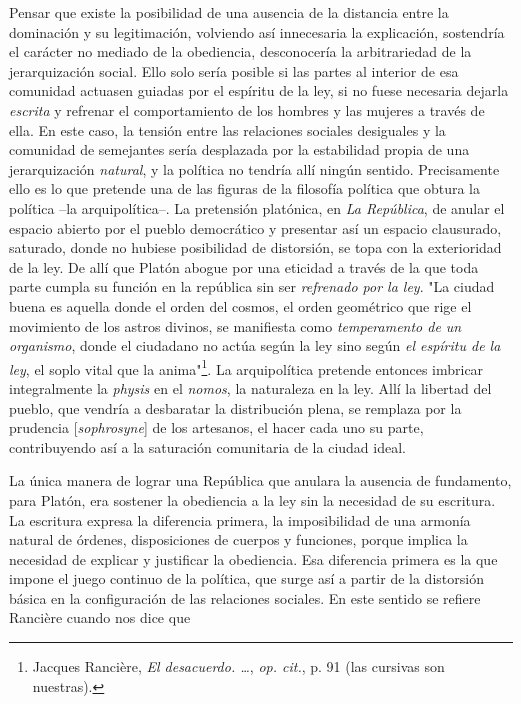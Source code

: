 Pensar que existe la posibilidad de una ausencia de la distancia entre
la dominación y su legitimación, volviendo así innecesaria la
explicación, sostendría el carácter no mediado de la obediencia,
desconocería la arbitrariedad de la jerarquización social. Ello solo
sería posible si las partes al interior de esa comunidad actuasen
guiadas por el espíritu de la ley, si no fuese necesaria dejarla
\emph{escrita} y refrenar el comportamiento de los hombres y las mujeres
a través de ella. En este caso, la tensión entre las relaciones sociales
desiguales y la comunidad de semejantes sería desplazada por la
estabilidad propia de una jerarquización \emph{natural}, y la política
no tendría allí ningún sentido. Precisamente ello es lo que pretende una
de las figuras de la filosofía política que obtura la política --la
arquipolítica--. La pretensión platónica, en \emph{La República}, de
anular el espacio abierto por el pueblo democrático y presentar así un
espacio clausurado, saturado, donde no hubiese posibilidad de
distorsión, se topa con la exterioridad de la ley. De allí que Platón
abogue por una eticidad a través de la que toda parte cumpla su función
en la república sin ser \emph{refrenado por la ley}. "La ciudad buena es
aquella donde el orden del cosmos, el orden geométrico que rige el
movimiento de los astros divinos, se manifiesta como \emph{temperamento
de un organismo}, donde el ciudadano no actúa según la ley sino según
\emph{el espíritu de la ley}, el soplo vital que la anima"\footnote{Jacques
  Rancière, \emph{El desacuerdo. \ldots{}}, \emph{op. cit.}, p. 91 (las
  cursivas son nuestras).}. La arquipolítica pretende entonces imbricar
integralmente la \emph{physis} en el \emph{nomos}, la naturaleza en la
ley. Allí la libertad del pueblo, que vendría a desbaratar la
distribución plena, se remplaza por la prudencia {[}\emph{sophrosyne}{]}
de los artesanos, el hacer cada uno su parte, contribuyendo así a la
saturación comunitaria de la ciudad ideal.

La única manera de lograr una República que anulara la ausencia de
fundamento, para Platón, era sostener la obediencia a la ley sin la
necesidad de su escritura. La escritura expresa la diferencia primera,
la imposibilidad de una armonía natural de órdenes, disposiciones de
cuerpos y funciones, porque implica la necesidad de explicar y
justificar la obediencia. Esa diferencia primera es la que impone el
juego continuo de la política, que surge así a partir de la distorsión
básica en la configuración de las relaciones sociales. En este sentido
se refiere Rancière cuando nos dice que

